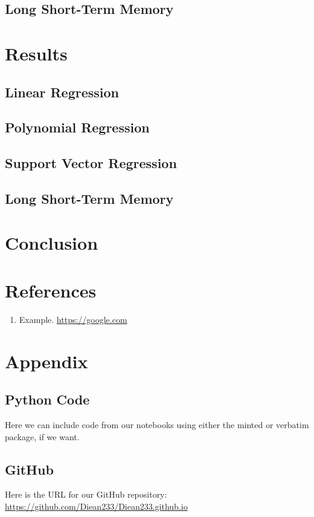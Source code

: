 \documentclass[letterpaper,11pt]{article}
\begin{document}
\subsection{Long Short-Term Memory}








\section{Results}

\subsection{Linear Regression}

\subsection{Polynomial Regression}

\subsection{Support Vector Regression}

\subsection{Long Short-Term Memory}




\section{Conclusion}



\section*{References}
\begin{enumerate}
    \item Example. \url{https://google.com}

\end{enumerate}


\appendix
\section{Appendix}

\subsection{Python Code}
Here we can include code from our notebooks using either the minted or verbatim package, if we want.



\subsection{GitHub}

Here is the URL for our GitHub repository:\\

\url{https://github.com/Diean233/Diean233.github.io}
\end{document}

